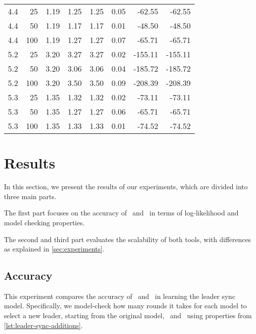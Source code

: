 \begin{table}
\begin{tabular}{rrrrrrrr}
        4.4           & 25  & 1.19 & 1.25     & 1.25      & 0.05   & -62.55     & -62.55    \\
        4.4           & 50  & 1.19 & 1.17     & 1.17      & 0.01   & -48.50     & -48.50    \\
        4.4           & 100 & 1.19 & 1.27     & 1.27      & 0.07   & -65.71     & -65.71    \\
        5.2           & 25  & 3.20 & 3.27     & 3.27      & 0.02   & -155.11    & -155.11   \\
        5.2           & 50  & 3.20 & 3.06     & 3.06      & 0.04   & -185.72    & -185.72   \\
        5.2           & 100 & 3.20 & 3.50     & 3.50      & 0.09   & -208.39    & -208.39   \\
        5.3           & 25  & 1.35 & 1.32     & 1.32      & 0.02   & -73.11     & -73.11    \\
        5.3           & 50  & 1.35 & 1.27     & 1.27      & 0.06   & -65.71     & -65.71    \\
        5.3           & 100 & 1.35 & 1.33     & 1.33      & 0.01   & -74.52     & -74.52    \\
        \bottomrule
    \end{tabular}
\end{table}

\section{Results}\label{sec:results}
In this section, we present the results of our experiments, which are divided into three main parts.

The first part focuses on the accuracy of \Jajapy\ and \Cupaal\ in terms of log-likelihood and model checking properties.

The second and third part evaluates the scalability of both tools, with differences as explained in \autoref{sec:experiments}.

\subsection{Accuracy}\label{subsec:accuracy}
This experiment compares the accuracy of \Cupaal\ and \Jajapy\ in learning the leader sync model. Specifically, we model-check how many rounds it takes for each model to select a new leader, starting from the original model, \Jajapy\ and \Cupaal\, using properties from \autoref{lst:leader-sync-additions}.

